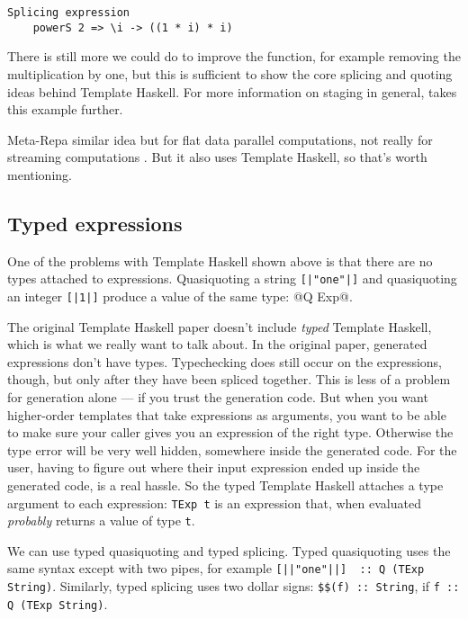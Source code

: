 \begin{lstlisting}
Splicing expression
    powerS 2 => \i -> ((1 * i) * i)
\end{lstlisting}

There is still more we could do to improve the function, for example removing the multiplication by one, but this is sufficient to show the core splicing and quoting ideas behind Template Haskell.
For more information on staging in general, \citet{rompf2010lightweight} takes this example further.

Meta-Repa similar idea but for flat data parallel computations, not really for streaming computations \cite{ankner2013edsl}.
But it also uses Template Haskell, so that's worth mentioning.

\subsection{Typed expressions}

One of the problems with Template Haskell shown above is that there are no types attached to expressions.
Quasiquoting a string \lstinline/[|"one"|]/ and quasiquoting an integer \lstinline/[|1|]/ produce a value of the same type: @Q Exp@.

The original Template Haskell paper  doesn't include \emph{typed} Template Haskell, which is what we really want to talk about.
In the original paper, generated expressions don't have types.
Typechecking does still occur on the expressions, though, but only after they have been spliced together.
This is less of a problem for generation alone --- if you trust the generation code.
But when you want higher-order templates that take expressions as arguments, you want to be able to make sure your caller gives you an expression of the right type.
Otherwise the type error will be very well hidden, somewhere inside the generated code.
For the user, having to figure out where their input expression ended up inside the generated code, is a real hassle.
So the typed Template Haskell attaches a type argument to each expression: \lstinline|TExp t| is an expression that, when evaluated \emph{probably} returns a value of type \lstinline|t|.

We can use typed quasiquoting and typed splicing.
Typed quasiquoting uses the same syntax except with two pipes, for example \lstinline/[||"one"||]  :: Q (TExp String)/.
Similarly, typed splicing uses two dollar signs: \lstinline/$$(f) :: String/, if \lstinline/f :: Q (TExp String)/.

